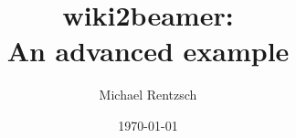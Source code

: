 \documentclass{beamer}
\title{wiki2beamer: \\ An advanced example}
\author{Michael Rentzsch}
\date{\today}
\begin{document}
\frame{\titlepage}


\end{document}
